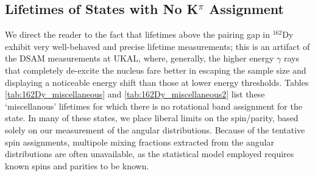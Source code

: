 \subsection{Lifetimes of States with No K$^\pi$ Assignment}
We direct the reader to the fact that lifetimes above the pairing gap in $^{162}$Dy exhibit very well-behaved and precise lifetime measurements; this is an artifact of the DSAM measurements at UKAL, where, generally, the higher energy $\gamma$ rays that completely de-excite the nucleus fare better in escaping the sample size and displaying a noticeable energy shift than those at lower energy thresholds. Tables \ref{tab:162Dy_miscellaneous} and \ref{tab:162Dy_miscellaneous2} list these `miscellanous' lifetimes for which there is no rotational band assignment for the state. In many of these states, we place liberal limits on the spin/parity, based solely on our measurement of the angular distributions. Because of the tentative spin assignments, multipole mixing fractions extracted from the angular distributions are often unavailable, as the statistical model employed requires known spins and parities to be known.



